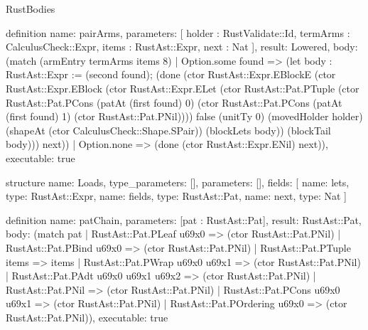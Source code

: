 \begin{lexlean}{RustBodies}
\begin{semanticmodule}
definition{
  name: pairArms,
  parameters: [
    holder : RustValidate::Id,
    termArms : CalculusCheck::Expr,
    items : RustAst::Expr,
    next : Nat
  ],
  result: Lowered,
  body: (match (armEntry termArms items 8)
    | Option.some found => (let body : RustAst::Expr := (second found); (done (ctor RustAst::Expr.EBlockE (ctor RustAst::Expr.EBlock (ctor RustAst::Expr.ELet (ctor RustAst::Pat.PTuple (ctor RustAst::Pat.PCons (patAt (first found) 0) (ctor RustAst::Pat.PCons (patAt (first found) 1) (ctor RustAst::Pat.PNil)))) false (unitTy 0) (movedHolder holder) (shapeAt (ctor CalculusCheck::Shape.SPair)) (blockLets body)) (blockTail body))) next))
    | Option.none => (done (ctor RustAst::Expr.ENil) next)),
  executable: true
}

structure{
  name: Loads,
  type_parameters: [],
  parameters: [],
  fields: [
    {name: lets, type: RustAst::Expr},
    {name: fields, type: RustAst::Pat},
    {name: next, type: Nat}
  ]
}

definition{
  name: patChain,
  parameters: [pat : RustAst::Pat],
  result: RustAst::Pat,
  body: (match pat
    | RustAst::Pat.PLeaf u69x0 => (ctor RustAst::Pat.PNil)
    | RustAst::Pat.PBind u69x0 => (ctor RustAst::Pat.PNil)
    | RustAst::Pat.PTuple items => items
    | RustAst::Pat.PWrap u69x0 u69x1 => (ctor RustAst::Pat.PNil)
    | RustAst::Pat.PAdt u69x0 u69x1 u69x2 => (ctor RustAst::Pat.PNil)
    | RustAst::Pat.PNil => (ctor RustAst::Pat.PNil)
    | RustAst::Pat.PCons u69x0 u69x1 => (ctor RustAst::Pat.PNil)
    | RustAst::Pat.POrdering u69x0 => (ctor RustAst::Pat.PNil)),
  executable: true
}


\end{semanticmodule}
\end{lexlean}
